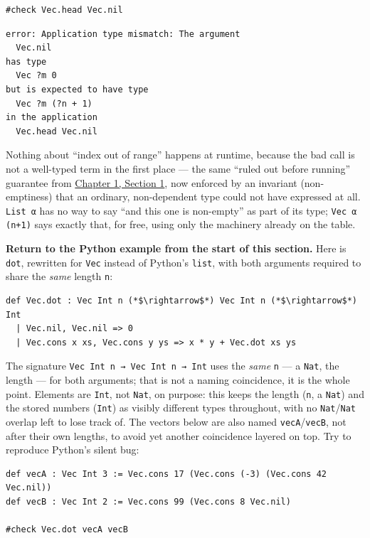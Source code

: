 \begin{lstlisting}
#check Vec.head Vec.nil
\end{lstlisting}

\begin{lstlisting}
error: Application type mismatch: The argument
  Vec.nil
has type
  Vec ?m 0
but is expected to have type
  Vec ?m (?n + 1)
in the application
  Vec.head Vec.nil
\end{lstlisting}

Nothing about ``index out of range'' happens at runtime, because the bad call is not a well-typed term in the first place --- the same ``ruled out before running'' guarantee from \hyperref[sec:01-basics:01-everything-has-a-type:1]{Chapter 1, Section 1}, now enforced by an invariant (non-emptiness) that an ordinary, non-dependent type could not have expressed at all. \texttt{List α} has no way to say ``and this one is non-empty'' as part of its type; \texttt{Vec α (n+1)} says exactly that, for free, using only the machinery already on the table.

\textbf{Return to the Python example from the start of this section.} Here is \texttt{dot}, rewritten for \texttt{Vec} instead of Python's \texttt{list}, with both arguments required to share the \emph{same} length \texttt{n}:

\begin{lstlisting}
def Vec.dot : Vec Int n (*$\rightarrow$*) Vec Int n (*$\rightarrow$*) Int
  | Vec.nil, Vec.nil => 0
  | Vec.cons x xs, Vec.cons y ys => x * y + Vec.dot xs ys
\end{lstlisting}

The signature \texttt{Vec Int n → Vec Int n → Int} uses the \emph{same} \texttt{n} --- a \texttt{Nat}, the length --- for both arguments; that is not a naming coincidence, it is the whole point. Elements are \texttt{Int}, not \texttt{Nat}, on purpose: this keeps the length (\texttt{n}, a \texttt{Nat}) and the stored numbers (\texttt{Int}) as visibly different types throughout, with no \texttt{Nat}/\texttt{Nat} overlap left to lose track of. The vectors below are also named \texttt{vecA}/\texttt{vecB}, not after their own lengths, to avoid yet another coincidence layered on top. Try to reproduce Python's silent bug:

\begin{lstlisting}
def vecA : Vec Int 3 := Vec.cons 17 (Vec.cons (-3) (Vec.cons 42 Vec.nil))
def vecB : Vec Int 2 := Vec.cons 99 (Vec.cons 8 Vec.nil)

#check Vec.dot vecA vecB
\end{lstlisting}

